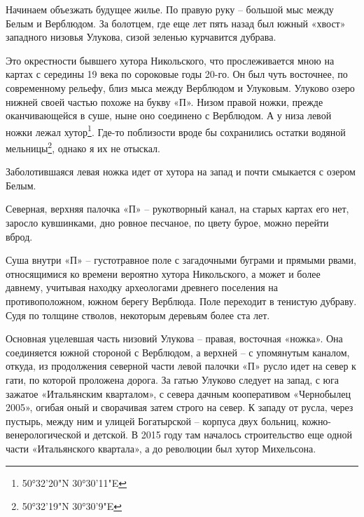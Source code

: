 Начинаем объезжать будущее жилье. По правую руку – большой мыс между Белым и Верблюдом. За болотцем, где еще лет пять назад был южный «хвост» западного низовья Улукова, сизой зеленью курчавится дубрава.

Это окрестности бывшего хутора Никольского, что прослеживается мною на картах с середины 19 века по сороковые годы 20-го. Он был чуть восточнее, по современному рельефу, близ мыса между Верблюдом и Улуковым. Улуково озеро нижней своей частью похоже на букву «П». Низом правой ножки, прежде оканчивающейся в суше, ныне оно соединено с Верблюдом. А у низа левой ножки лежал хутор\footnote{50°32'20"N 30°30'11"E}. Где-то поблизости вроде бы сохранились остатки водяной мельницы\footnote{50°32'19"N 30°30'9"E}, однако я их не отыскал.

Заболотившаяся левая ножка идет от хутора на запад и почти смыкается с озером Белым.

Северная, верхняя палочка «П» – рукотворный канал, на старых картах его нет, заросло кувшинками, дно ровное песчаное, по цвету бурое, можно перейти вброд.

Суша внутри «П» – густотравное поле с загадочными буграми и прямыми рвами, относящимися ко времени вероятно хутора Никольского, а может и более давнему, учитывая находку археологами древнего поселения на противоположном, южном берегу Верблюда. Поле переходит в тенистую дубраву. Судя по толщине стволов, некоторым деревьям более ста лет.

Основная уцелевшая часть низовий Улукова – правая, восточная «ножка». Она соединяется южной стороной с Верблюдом, а верхней – с упомянутым каналом, откуда, из продолжения северной части левой палочки «П» русло идет на север к гати, по которой проложена дорога. За гатью Улуково следует на запад, с юга зажатое «Итальянским кварталом», с севера дачным кооперативом «Чернобылец 2005», огибая оный и сворачивая затем строго на север. К западу от русла, через пустырь, между ним и улицей Богатырской – корпуса двух больниц, кожно-венерологической и детской. В 2015 году там началось строительство еще одной части «Итальянского квартала», а до революции был хутор Михельсона.

